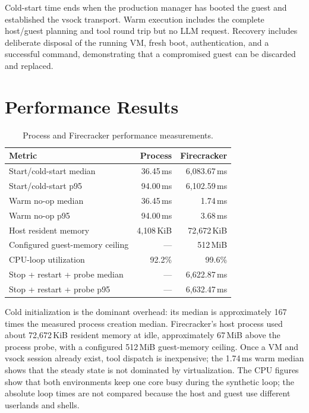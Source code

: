 Cold-start time ends when the production manager has booted the guest and established
the vsock transport. Warm execution includes the complete host/guest planning and tool
round trip but no LLM request. Recovery includes deliberate disposal of the running VM,
fresh boot, authentication, and a successful command, demonstrating that a compromised
guest can be discarded and replaced.

\section{Performance Results}
\begin{table}[htbp]
    \centering
    \caption{Process and Firecracker performance measurements.}
    \label{tab:h2_performance}
    \small
    \begin{tabular}{@{}p{5.6cm}rr@{}}
        \toprule
        \textbf{Metric} & \textbf{Process} & \textbf{Firecracker} \\
        \midrule
        Start/cold-start median & 36.45\,ms & 6{,}083.67\,ms \\
        Start/cold-start p95 & 94.00\,ms & 6{,}102.59\,ms \\
        Warm no-op median & 36.45\,ms & 1.74\,ms \\
        Warm no-op p95 & 94.00\,ms & 3.68\,ms \\
        Host resident memory & 4{,}108\,KiB & 72{,}672\,KiB \\
        Configured guest-memory ceiling & --- & 512\,MiB \\
        CPU-loop utilization & 92.2\% & 99.6\% \\
        Stop + restart + probe median & --- & 6{,}622.87\,ms \\
        Stop + restart + probe p95 & --- & 6{,}632.47\,ms \\
        \bottomrule
    \end{tabular}
\end{table}

Cold initialization is the dominant overhead: its median is approximately 167 times
the measured process creation median. Firecracker's host process used about
72{,}672\,KiB resident memory at idle, approximately 67\,MiB above the process probe,
with a configured 512\,MiB guest-memory ceiling. Once a VM and vsock session already
exist, tool dispatch is inexpensive; the 1.74\,ms warm median shows that the steady
state is not dominated by virtualization. The CPU figures show that both environments
keep one core busy during the synthetic loop; the absolute loop times are not compared
because the host and guest use different userlands and shells.

